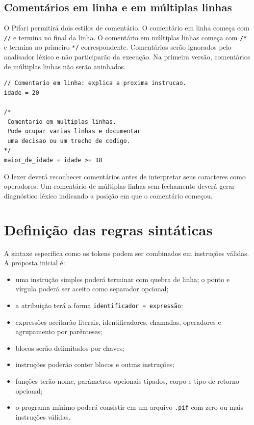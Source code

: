 \documentclass[12pt,a4paper]{article}
\begin{document}
\subsection{Comentários em linha e em múltiplas linhas}
O Pifari permitirá dois estilos de comentário. O comentário em linha começa com \texttt{//} e termina no final da linha. O comentário em múltiplas linhas começa com \texttt{/*} e termina no primeiro \texttt{*/} correspondente. Comentários serão ignorados pelo analisador léxico e não participarão da execução. Na primeira versão, comentários de múltiplas linhas não serão aninhados.

\begin{lstlisting}
// Comentario em linha: explica a proxima instrucao.
idade = 20

/*
 Comentario em multiplas linhas.
 Pode ocupar varias linhas e documentar
 uma decisao ou um trecho de codigo.
*/
maior_de_idade = idade >= 18
\end{lstlisting}

O lexer deverá reconhecer comentários antes de interpretar seus caracteres como operadores. Um comentário de múltiplas linhas sem fechamento deverá gerar diagnóstico léxico indicando a posição em que o comentário começou.

\section{Definição das regras sintáticas}
A sintaxe especifica como os tokens podem ser combinados em instruções válidas. A proposta inicial é:
\begin{itemize}
\item uma instrução simples poderá terminar com quebra de linha; o ponto e vírgula poderá ser aceito como separador opcional;
\item a atribuição terá a forma \texttt{identificador = expressão};
\item expressões aceitarão literais, identificadores, chamadas, operadores e agrupamento por parênteses;
\item blocos serão delimitados por chaves;
\item instruções poderão conter blocos e outras instruções;
\item funções terão nome, parâmetros opcionais tipados, corpo e tipo de retorno opcional;
\item o programa mínimo poderá consistir em um arquivo \texttt{.pif} com zero ou mais instruções válidas.
\end{itemize}
\end{document}
